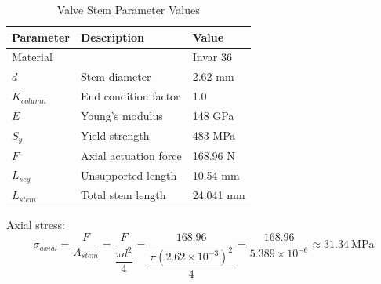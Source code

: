 \documentclass[12pt, letterpaper]{report}%
\begin{document}
                \begin{table}[H]
                        \centering
                        \caption{Valve Stem Parameter Values}
                        \label{tab:stem_parameters}
                        \begin{tabularx}{\textwidth}{l X l}
                            \toprule
                            \textbf{Parameter} & \textbf{Description} & \textbf{Value} \\
                            \midrule
                            Material &
                                    &
                            Invar 36
                            \\\addlinespace
                            $d$ &
                            Stem diameter &
                            2.62 mm
                            \\\addlinespace
                            $K_{column}$ &
                            End condition factor &
                            1.0
                            \\\addlinespace
                            $E$ &
                            Young's modulus &
                            148 GPa \cite{matweb}
                            \\\addlinespace
                            $S_y$ &
                            Yield strength &
                            483 MPa \cite{matweb}
                            \\\addlinespace
                            $F$ &
                            Axial actuation force &
                            168.96 N
                            \\\addlinespace
                            $L_{seg}$ &
                            Unsupported length &
                            10.54 mm
                            \\\addlinespace
                            $L_{stem}$ &
                            Total stem length &
                            24.041 mm \cite{matweb}
                            \\\bottomrule
                        \end{tabularx}
                    \end{table}

                Axial stress:
                \begin{equation}
                \sigma_{axial} = \frac{F}{A_{stem}} = \frac{F}{\dfrac{\pi d^2}{4}} = \frac{168.96}{\dfrac{\pi (2.62 \times 10^{-3})^2}{4}} = \frac{168.96}{5.389 \times 10^{-6}} \approx 31.34 \ \text{MPa}
                \label{axial_stress}
                \end{equation}
\end{document}
